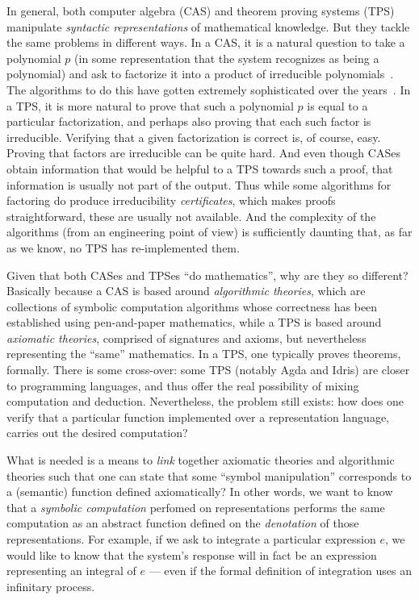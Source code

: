 \documentclass[fleqn]{llncs}
\begin{document}
In general, both computer algebra (CAS) and theorem proving systems (TPS)
manipulate \emph{syntactic representations} of mathematical knowledge.  But
they tackle the same problems in different ways. In a CAS, it is a natural
question to take a polynomial $p$ (in some representation that the system
recognizes as being a polynomial) and ask to factorize it into a product of
irreducible polynomials~\cite{von2003modern}.  The algorithms to do this
have gotten extremely sophisticated over the years~\cite{vanhoeij2002}.
In a TPS, it is more natural to prove that such a polynomial $p$ is
equal to a particular factorization, and perhaps also proving that each
such factor is irreducible. Verifying that a given factorization is 
correct is, of course, easy. Proving that factors are irreducible can be
quite hard. And even though CASes obtain information that would be helpful
to a TPS towards such a proof, that information is usually not part of
the output. Thus while some algorithms for factoring do produce irreducibility
\emph{certificates}, which makes proofs straightforward, these are usually
not available. And the complexity of the algorithms (from an engineering
point of view) is sufficiently daunting that, as far as we know, no TPS
has re-implemented them.

Given that both CASes and TPSes ``do mathematics'', why are they so 
different? Basically because a CAS is based around
\emph{algorithmic theories}, which are collections of symbolic computation
algorithms whose correctness has been established using pen-and-paper
mathematics, while a TPS is based around \emph{axiomatic theories},
comprised of signatures and axioms, but nevertheless representing the
``same'' mathematics. In a TPS, one typically proves theorems, formally.
There is some cross-over: some TPS (notably Agda and Idris) are closer
to programming languages, and thus offer the real possibility of mixing
computation and deduction. Nevertheless, the problem still exists: how
does one verify that a particular function implemented over a representation
language, carries out the desired computation?

What is needed is a means to \emph{link} together axiomatic theories
and algorithmic theories such that one can state that some ``symbol
manipulation'' corresponds to a (semantic) function defined axiomatically?
In other words, we want to know that a \emph{symbolic computation}
perfomed on representations performs the same computation as an abstract
function defined on the \emph{denotation} of those representations.
For example, if we ask to integrate a particular expression $e$, we would like
to know that the system's response will in fact be an expression representing
an integral of $e$ --- even if the formal definition of integration uses an
infinitary process.
\end{document}
